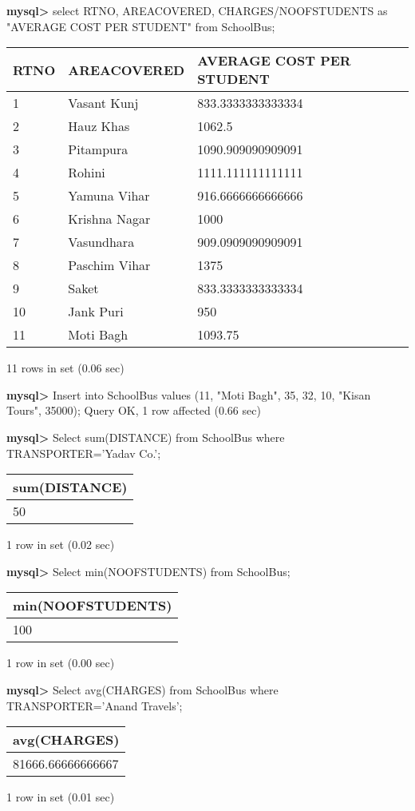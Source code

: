 \documentclass[11pt]{article}
\begin{document}
\textbf{mysql>} select RTNO, AREACOVERED, CHARGES/NOOFSTUDENTS as "AVERAGE COST PER STUDENT" from SchoolBus;
\begin{center}
\begin{tabular}{|l|l|l|}
\hline
RTNO & AREACOVERED & AVERAGE COST PER STUDENT \\
\hline
1 & Vasant Kunj & 833.3333333333334 \\
2 & Hauz Khas & 1062.5 \\
3 & Pitampura & 1090.909090909091 \\
4 & Rohini & 1111.111111111111 \\
5 & Yamuna Vihar & 916.6666666666666 \\
6 & Krishna Nagar & 1000 \\
7 & Vasundhara & 909.0909090909091 \\
8 & Paschim Vihar & 1375 \\
9 & Saket & 833.3333333333334 \\
10 & Jank Puri & 950 \\
11 & Moti Bagh & 1093.75 \\
\hline
\end{tabular}
\end{center}
11 rows in set (0.06 sec)

\textbf{mysql>} Insert into SchoolBus values (11, "Moti Bagh", 35, 32, 10, "Kisan Tours", 35000);
Query OK, 1 row affected (0.66 sec)

\textbf{mysql>} Select sum(DISTANCE) from SchoolBus where TRANSPORTER='Yadav Co.';
\begin{center}
\begin{tabular}{|l|}
\hline
sum(DISTANCE) \\
\hline
50 \\
\hline
\end{tabular}
\end{center}
1 row in set (0.02 sec)

\textbf{mysql>} Select min(NOOFSTUDENTS) from SchoolBus;
\begin{center}
\begin{tabular}{|l|}
\hline
min(NOOFSTUDENTS) \\
\hline
100 \\
\hline
\end{tabular}
\end{center}
1 row in set (0.00 sec)

\textbf{mysql>} Select avg(CHARGES) from SchoolBus where TRANSPORTER='Anand Travels';
\begin{center}
\begin{tabular}{|l|}
\hline
avg(CHARGES) \\
\hline
81666.66666666667 \\
\hline
\end{tabular}
\end{center}
1 row in set (0.01 sec)
\end{document}
